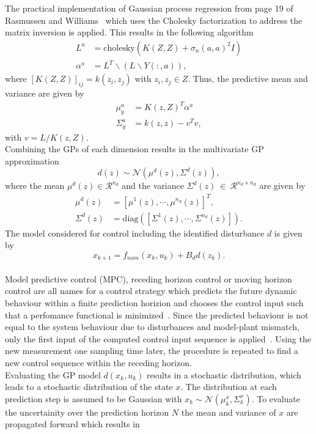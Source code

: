 \documentclass[letterpaper, 10 pt, conference]{ieeeconf}  %
\begin{document}
The practical implementation of Gaussian process regression from page 19 of Rasmussen and Williams~\cite{williams2006gaussian} which uses the Cholesky factorization to address the matrix inversion is applied. This results in the following algorithm
\begin{align}
L^a &= \text{cholesky}(K(Z,Z) + \sigma_n(a,a)^2I)\\
\alpha^a &= L^T\backslash(L \backslash Y(:,a)),
\end{align}
where $[K(Z,Z)]_{ij}=k(z_i,z_j)$ with $z_i, z_j \in Z$.
Thus, the predictive mean and variance are given by
\begin{align}
\mu_y^a&=K(z,Z)^T\alpha^a\\
\Sigma_y^a&=k(z,z)-v^Tv,
\end{align}
with $v=L/K(z,Z)$.\\
Combining the GPs of each dimension results in the multivariate GP approximation 
\begin{equation}
d(z)\sim \mathcal{N}(\mu^d(z),\Sigma^d(z)),
\end{equation}
where the mean $\mu^d(z) \in \mathcal{R}^{n_d}$ and the variance $\Sigma^d(z)~\in~\mathcal{R}^{n_d \times n_d}$ are given by
\begin{align}
\mu^d(z) &= [\mu^1(z),\cdots, \mu^{n_d}(z)]^T,\\
\Sigma^d(z) &= \text{diag}([\Sigma^1(z),\cdots, \Sigma^{n_d}(z)]).
\end{align}
The model considered for control including the identified disturbance $d$ is given by
\begin{equation}
x_{k+1} = f_{nom}(x_k,u_k) + B_d d(z_k).
\end{equation}
 \\
Model predictive control (MPC), receding  horizon  control or moving horizon control are all names for a control strategy which predicts the future dynamic behaviour within a finite prediction horizion and chooses the control input such that a perfomance functional is minimized~\cite{allgeowernonlinear}. Since the predicted behaviour is not equal to the system behaviour due to disturbances and model-plant mismatch, only the first input of the computed control input sequence is applied~\cite{allgeowernonlinear}. Using the new measurement one sampling time later, the procedure is repeated to find a new control sequence within the receding horizon.\\
Evaluating the GP model $d(x_k,u_k)$ results in a stochastic distribution, which leads to a stochastic distribution of the state $x$. The distribution at each prediction step is assumed to be Gaussian with $x_k \sim \mathcal{N}(\mu^x_k,\Sigma^x_k)$. To evaluate the uncertainity over the prediction horizon $N$ the mean and variance of $x$ are propagated forward which results in
\end{document}
